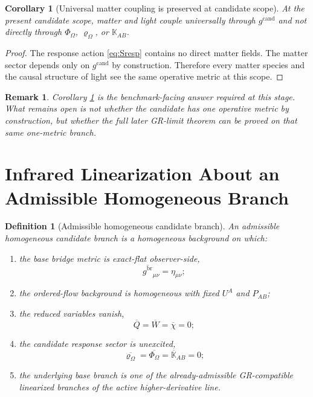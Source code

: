 \documentclass[11pt]{article}
\newcommand{\ProjSub}{P}
\newcommand{\ObserverMetric}{g^{\mathrm{br}}}
\newcommand{\CandidateMetric}{g^{\mathrm{cand}}}
\newcommand{\AuxPol}{\mathbb K}
\newcommand{\FlowPot}{\Phi_\Omega}
\newcommand{\SourceDensity}{\varrho_\Omega}
\newtheorem{definition}{Definition}
\newtheorem{remark}{Remark}
\newtheorem{corollary}{Corollary}
\begin{document}
\begin{corollary}[Universal matter coupling is preserved at candidate scope]
\label{cor:universalmatter}
At the present candidate scope, matter and light couple universally through \(\CandidateMetric\) and not directly through \(\FlowPot\), \(\SourceDensity\), or \(\AuxPol_{AB}\).
\end{corollary}

\begin{proof}
The response action \eqref{eq:Sresp} contains no direct matter fields. The matter sector depends only on \(\CandidateMetric\) by construction. Therefore every matter species and the causal structure of light see the same operative metric at this scope.
\end{proof}

\begin{remark}
Corollary \ref{cor:universalmatter} is the benchmark-facing answer required at this stage. What remains open is not whether the candidate has one operative metric by construction, but whether the full later GR-limit theorem can be proved on that same one-metric branch.
\end{remark}

\section{Infrared Linearization About an Admissible Homogeneous Branch}

\begin{definition}[Admissible homogeneous candidate branch]
\label{def:branch}
An \emph{admissible homogeneous candidate branch} is a homogeneous background on which:
\begin{enumerate}
    \item the base bridge metric is exact-flat observer-side,
    \begin{equation}
    \overline{\ObserverMetric}_{\mu\nu}=\eta_{\mu\nu};
    \label{eq:flatbranch}
    \end{equation}
    \item the ordered-flow background is homogeneous with fixed \(U^A\) and \(\ProjSub_{AB}\);
    \item the reduced variables vanish,
    \begin{equation}
    \overline Q=\overline W=\overline\chi=0;
    \label{eq:reducedzero}
    \end{equation}
    \item the candidate response sector is unexcited,
    \begin{equation}
    \overline{\SourceDensity}
    =
    \overline{\FlowPot}
    =
    \overline{\AuxPol}_{AB}
    =0;
    \label{eq:responsezero}
    \end{equation}
    \item the underlying base branch is one of the already-admissible GR-compatible linearized branches of the active higher-derivative line.
\end{enumerate}
\end{definition}
\end{document}
